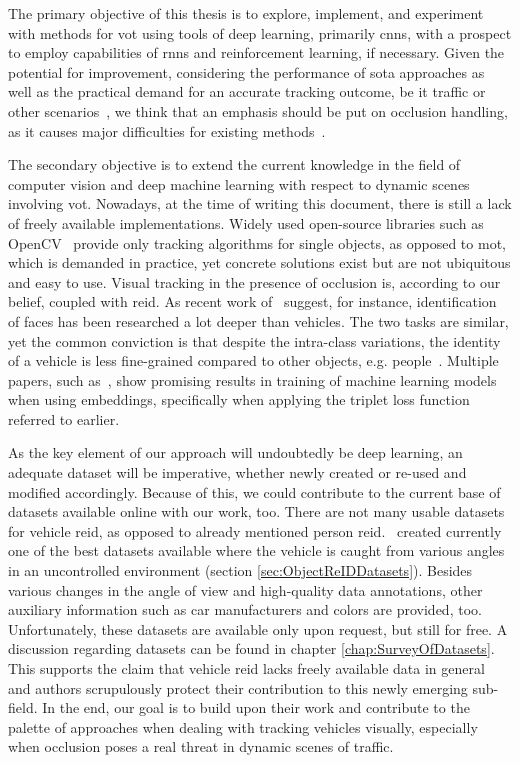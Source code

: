 The primary objective of this thesis is to explore, implement, and experiment with methods for \gls{vot} using tools of deep learning, primarily \glspl{cnn}, with a prospect to employ capabilities of \glspl{rnn} and reinforcement learning, if necessary. Given the potential for improvement, considering the performance of \gls{sota} approaches as well as the practical demand for an accurate tracking outcome, be it traffic or other scenarios~\cite{tang2019cityflow}, we think that an emphasis should be put on occlusion handling, as it causes major difficulties for existing methods~\cite{jiyan2007robustocclusion}.

The secondary objective is to extend the current knowledge in the field of computer vision and deep machine learning with respect to dynamic scenes involving \gls{vot}. Nowadays, at the time of writing this document, there is still a lack of freely available implementations. Widely used open-source libraries such as OpenCV~\cite{bradski2000opencv} provide only tracking algorithms for single objects, as opposed to \gls{mot}, which is demanded in practice, yet concrete solutions exist but are not ubiquitous and easy to use. Visual tracking in the presence of occlusion is, according to our belief, coupled with \gls{reid}. As recent work of~\cite{kuma2019vehiclereid} suggest, for instance, identification of faces has been researched a lot deeper than vehicles. The two tasks are similar, yet the common conviction is that despite the intra-class variations, the identity of a vehicle is less fine-grained compared to other objects, e.g. people~\cite{kuma2019vehiclereid}. Multiple papers, such as~\cite{schroff2015facenet, hermans2017triplet}, show promising results in training of machine learning models when using embeddings, specifically when applying the triplet loss function referred to earlier.

As the key element of our approach will undoubtedly be deep learning, an adequate dataset will be imperative, whether newly created or re-used and modified accordingly. Because of this, we could contribute to the current base of datasets available online with our work, too. There are not many usable datasets for vehicle \gls{reid}, as opposed to already mentioned person \gls{reid}.~\cite{liu2018provid, yan2017exploiting} created currently one of the best datasets available where the vehicle is caught from various angles in an uncontrolled environment (section \ref{sec:ObjectReIDDatasets}). Besides various changes in the angle of view and high-quality data annotations, other auxiliary information such as car manufacturers and colors are provided, too. Unfortunately, these datasets are available only upon request, but still for free. A discussion regarding datasets can be found in chapter \ref{chap:SurveyOfDatasets}. This supports the claim that vehicle \gls{reid} lacks freely available data in general and authors scrupulously protect their contribution to this newly emerging sub-field. In the end, our goal is to build upon their work and contribute to the palette of approaches when dealing with tracking vehicles visually, especially when occlusion poses a real threat in dynamic scenes of traffic.
